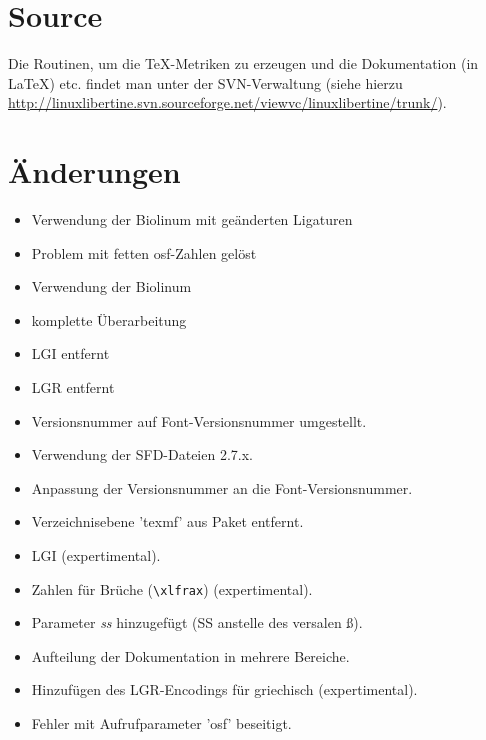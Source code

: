 \documentclass{fontdokuold}
\begin{document}
\section{Source}

Die Routinen, um die \TeX-Metriken zu erzeugen und die Dokumentation (in \LaTeX) etc. findet man unter der SVN-Verwaltung (siehe hierzu \url{http://linuxlibertine.svn.sourceforge.net/viewvc/linuxlibertine/trunk/}).


\section{Änderungen}

\begin{description}
\item [1. Mai 2009]
\begin{itemize}
\item Verwendung der Biolinum mit geänderten Ligaturen
\item Problem mit fetten osf-Zahlen gelöst
\end{itemize}
\item [29. März 2009]
\begin{itemize}
\item Verwendung der Biolinum
\item komplette Überarbeitung
\item LGI entfernt
\item LGR entfernt
\item Versionsnummer auf Font-Versionsnummer umgestellt.
\end{itemize}
\item [08. Januar 2008]
\begin{itemize}
\item Verwendung der SFD-Dateien 2.7.x.
\item Anpassung der Versionsnummer an die Font-Versionsnummer.
\item Verzeichnisebene 'texmf' aus Paket entfernt.
\item LGI (expertimental).
\item Zahlen für Brüche (\verb|\xlfrax|) (expertimental).
\item Parameter \emph{ss} hinzugefügt (SS anstelle des versalen ß).
\item Aufteilung der Dokumentation in mehrere Bereiche.
\item Hinzufügen des LGR-Encodings für griechisch (expertimental).
\item Fehler mit Aufrufparameter 'osf' beseitigt.

\end{itemize}
\end{description}
\end{document}

